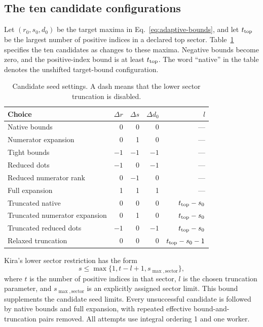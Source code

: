 \subsection{The ten candidate configurations}
Let $(r_0,s_0,d_0)$ be the target maxima in Eq.~\eqref{eq:adaptive-bounds}, and let $t_{\rm top}$ be the largest number of positive indices in a declared top sector. Table~\ref{tab:bounds-actions} specifies the ten candidates as changes to these maxima. Negative bounds become zero, and the positive-index bound is at least $t_{\rm top}$. The word ``native'' in the table denotes the unshifted target-bound configuration.
\begin{table}[!htbp]\centering\small
\caption{Candidate seed settings. A dash means that the lower sector truncation is disabled.}
\label{tab:bounds-actions}
\begin{tabular}{@{}lrrrr@{}}\toprule
Choice & $\Delta r$ & $\Delta s$ & $\Delta d_0$ & $l$\\\midrule
Native bounds &0&0&0&---\\
Numerator expansion &0&1&0&---\\
Tight bounds &$-1$&$-1$&$-1$&---\\
Reduced dots &$-1$&0&$-1$&---\\
Reduced numerator rank &0&$-1$&0&---\\
Full expansion &1&1&1&---\\
Truncated native &0&0&0&$t_{\rm top}-s_0$\\
Truncated numerator expansion &0&1&0&$t_{\rm top}-s_0$\\
Truncated reduced dots &$-1$&0&$-1$&$t_{\rm top}-s_0$\\
Relaxed truncation &0&0&0&$t_{\rm top}-s_0-1$\\
\bottomrule\end{tabular}
\end{table}
Kira's lower sector restriction has the form~\cite{Kira3}
\begin{equation}
 s\leq\max\{1,t-l+1,s_{\max,\mathrm{sector}}\},
\label{eq:bounds-truncate}
\end{equation}
where $t$ is the number of positive indices in that sector, $l$ is the chosen truncation parameter, and $s_{\max,\mathrm{sector}}$ is an explicitly assigned sector limit. This bound supplements the candidate seed limits. Every unsuccessful candidate is followed by native bounds and full expansion, with repeated effective bound-and-truncation pairs removed. All attempts use integral ordering 1 and one worker.

